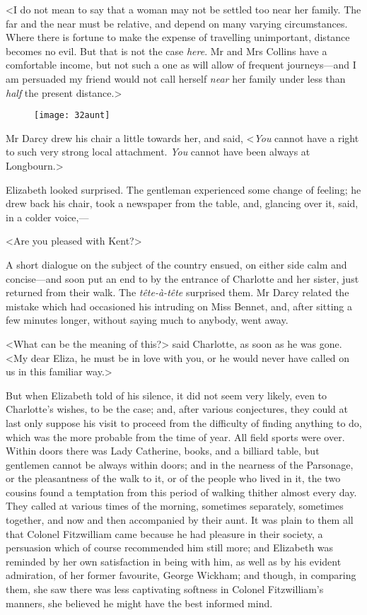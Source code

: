 <I do not mean to say that a woman may not be settled too near her family. The far and the near must be relative, and depend on many varying circumstances. Where there is fortune to make the expense of travelling unimportant, distance becomes no evil. But that is not the case \textit{here}. Mr and Mrs Collins have a comfortable income, but not such a one as will allow of frequent journeys—and I am persuaded my friend would not call herself \textit{near} her family under less than \textit{half} the present distance.>

\begin{figure}[tbph]
\centering
\texttt{[image: 32aunt]}
\end{figure}

Mr Darcy drew his chair a little towards her, and said, <\textit{You} cannot have a right to such very strong local attachment. \textit{You} cannot have been always at Longbourn.>

Elizabeth looked surprised. The gentleman experienced some change of feeling; he drew back his chair, took a newspaper from the table, and, glancing over it, said, in a colder voice,—

<Are you pleased with Kent?>

A short dialogue on the subject of the country ensued, on either side calm and concise—and soon put an end to by the entrance of Charlotte and her sister, just returned from their walk. The \textit{tête-à-tête} surprised them. Mr Darcy related the mistake which had occasioned his intruding on Miss Bennet, and, after sitting a few minutes longer, without saying much to anybody, went away.

<What can be the meaning of this?> said Charlotte, as soon as he was gone. <My dear Eliza, he must be in love with you, or he would never have called on us in this familiar way.>

But when Elizabeth told of his silence, it did not seem very likely, even to Charlotte's wishes, to be the case; and, after various conjectures, they could at last only suppose his visit to proceed from the difficulty of finding anything to do, which was the more probable from the time of year. All field sports were over. Within doors there was Lady Catherine, books, and a billiard table, but gentlemen cannot be always within doors; and in the nearness of the Parsonage, or the pleasantness of the walk to it, or of the people who lived in it, the two cousins found a temptation from this period of walking thither almost every day. They called at various times of the morning, sometimes separately, sometimes together, and now and then accompanied by their aunt. It was plain to them all that Colonel Fitzwilliam came because he had pleasure in their society, a persuasion which of course recommended him still more; and Elizabeth was reminded by her own satisfaction in being with him, as well as by his evident admiration, of her former favourite, George Wickham; and though, in comparing them, she saw there was less captivating softness in Colonel Fitzwilliam's manners, she believed he might have the best informed mind.




